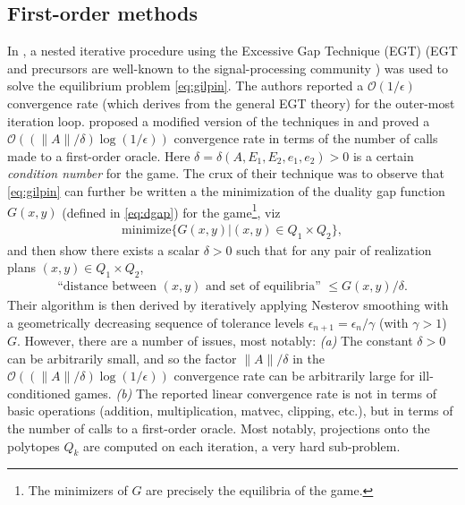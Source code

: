 \documentclass{article}
\begin{document}
\subsection{First-order methods}
In \cite{hoda2010smoothing}, a nested iterative procedure using the
Excessive Gap Technique (EGT) \cite{nesterov2005excessive} (EGT and
precursors are well-known to the signal-processing community
\cite{NESTA}) was used
to solve the equilibrium problem \eqref{eq:gilpin}.
The authors reported a $\mathcal{O}(1/\epsilon)$ convergence rate
(which derives from the general EGT theory) for the outer-most
iteration loop.
\cite{gilpinfirst} proposed a modified version of the techniques in
\cite{hoda2010smoothing} and  proved a $\mathcal{O}\left(\left(\|A\| /
\delta\right) \log \left(1 / \epsilon\right)\right)$ convergence rate in
terms of the number of calls made to a first-order oracle. Here
$\delta = \delta(A, E_1, E_2, e_1, e_2) > 0$ is a certain
\textit{condition number} for the game. The crux of their technique was to
observe that \eqref{eq:gilpin} can further be written a the minimization of
the duality gap function $G(x, y)$ (defined in \eqref{eq:dgap})
for the game\footnote{The minimizers of $G$ are precisely the
  equilibria of the game.}, viz
\begin{eqnarray}
\mathrm{minimize}\{G(x,y)|(x,y) \in Q_1 \times Q_2\},
\end{eqnarray}
and then show there exists a scalar
$\delta > 0$ such that for any pair of realization plans $(x, y) \in Q_1 \times Q_2$,
\begin{eqnarray*}
\text{``distance between }(x, y)\text{ and set of
equilibria'' } \le G(x, y)/\delta.
\end{eqnarray*}
Their
algorithm is then derived by iteratively applying Nesterov smoothing
\cite{nesterov2005a}
with a geometrically decreasing sequence of tolerance levels
$\epsilon_{n+1} = \epsilon_n / \gamma$ (with $\gamma > 1$)
$G$. However, there are a number of issues, most notably: \textit{(a)}
The constant $\delta > 0$ can be arbitrarily small, and so the factor
$\|A\| / \delta$ in the $\mathcal{O}\left(\left(\|A\| / \delta\right)
\log\left(1 / \epsilon\right)\right)$ convergence rate can be
arbitrarily large for ill-conditioned games.
\textit{(b)} The reported linear convergence rate is not in terms of
  basic operations (addition, multiplication, matvec, clipping, etc.),
  but in terms of the number of calls to a first-order oracle. Most
  notably, projections onto the polytopes $Q_k$ are computed on
  each iteration, a very hard sub-problem. %
\end{document}
